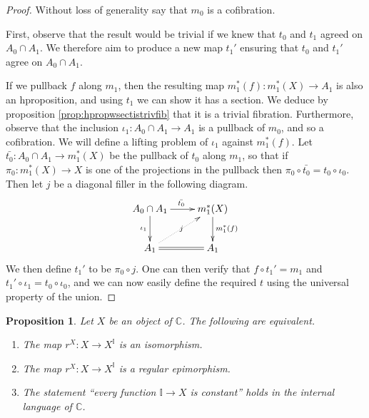 \documentclass[a4paper]{amsart}
\newtheorem{proposition}[theorem]{Proposition}
\theoremstyle{definition}
\newcommand{\cat}[1]{\mathbb{#1}}
\newcommand{\catc}{\cat{C}}
\newcommand{\intv}{\mathbb{I}}
\begin{document}
\begin{proof}
  Without loss of generality say that $m_0$ is a cofibration.
  
  First, observe that the result would be trivial if we knew that
  $t_0$ and $t_1$ agreed on $A_0 \cap A_1$. We therefore aim to
  produce a new map $t_1'$ ensuring that $t_0$ and $t_1'$ agree on
  $A_0 \cap A_1$.

  If we pullback $f$ along $m_1$, then the resulting map
  $m_1^\ast(f) \colon m_1^\ast(X) \to A_1$ is also an hproposition,
  and using $t_1$ we can show it has a section. We deduce by
  proposition \ref{prop:hpropwsectistrivfib} that it is a trivial
  fibration. Furthermore, observe that the inclusion
  $\iota_1 \colon A_0 \cap A_1 \rightarrow A_1$ is a pullback of
  $m_0$, and so a cofibration. We will define a lifting problem of
  $\iota_1$ against $m_1^\ast(f)$. Let
  $\bar{t_0} \colon A_0 \cap A_1 \to m_1^\ast(X)$ be the pullback of $t_0$
  along $m_1$, so that if $\pi_0 \colon m_1^\ast(X) \to X$ is one of
  the projections in the pullback then
  $\pi_0 \circ \bar{t_0} = t_0 \circ \iota_0$. Then let $j$ be a diagonal
  filler in the following diagram.
  \begin{equation*}
    \xymatrix{ A_0 \cap A_1 \ar[d]_{\iota_1} \ar[r]^{\bar{t_0}} &
      m_1^\ast(X) \ar[d]^{m_1^\ast(f)} \\
      A_1 \ar@{=}[r] \ar@{.>}[ur]|j & A_1}
  \end{equation*}
  We then define $t_1'$ to be $\pi_0 \circ j$. One can then verify
  that $f \circ t_1' = m_1$ and
  $t_1' \circ \iota_1 = t_0 \circ \iota_0$, and we can now easily
  define the required $t$ using the universal property of the union.
\end{proof}

\begin{proposition}
  \label{prop:discretedefs}
  Let $X$ be an object of $\catc$. The following are equivalent.
  \begin{enumerate}
  \item \label{reflisiso}The map $r^X \colon X \to X^\intv$ is an isomorphism.
  \item \label{reflisepi}The map $r^X \colon X \to X^\intv$ is a
    regular epimorphism.
  \item \label{allpathsconst}The statement ``every function
    $\intv \to X$ is constant'' holds in the internal language of
    $\catc$.
  \end{enumerate}
\end{proposition}
\end{document}
